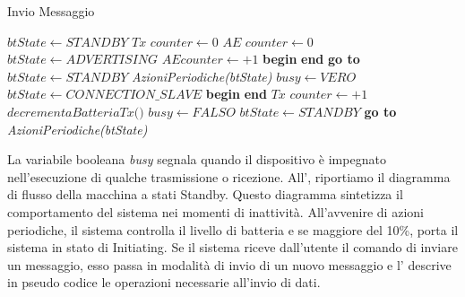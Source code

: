 \begin{algorithm}[ph]
	\caption{Invio Messaggio}\label{alg:invia_msg}
	\begin{algorithmic}[1]
		\State $ \textit{btState} \gets STANDBY$
		\EndIf
		\State $ \textit{Tx counter} \gets 0 $ 
		\Label {}
		\State $ \textit{AE counter} \gets 0 $ 
		\State $ \textit{btState} \gets ADVERTISING$
		\State $ AE counter \gets +1 $
		\State \textbf{begin}
		\State\hspace{\algorithmicindent}{ADVERTISING EVENT}
		\State \textbf{end}
		\State \textbf{go to} 
		\Else
		\State $btState \gets STANDBY$
		\State \textit{AzioniPeriodiche(btState)}
		\EndIf
		\EndIf
		\State $ \textit{busy}\gets VERO $
		\State $\textit{btState}\gets CONNECTION\_SLAVE$
		\State \textbf{begin}
		\State\hspace{\algorithmicindent}{CONNECTION EVENT}
		\State \textbf{end}
		\State $\textit{Tx counter}\gets +1$
		\State $ \textit{decrementaBatteriaTx()}$
		\State $\textit{busy}\gets FALSO$
		\State $ \textit{btState}\gets STANDBY $
		\State \textbf{go to} 
		\Else
		\State \textit{AzioniPeriodiche(btState)}
		\EndIf
		\EndFunction
	\end{algorithmic}
\end{algorithm}
La variabile booleana \textit{busy} segnala quando il dispositivo è impegnato nell'esecuzione di qualche trasmissione o ricezione. All', riportiamo il diagramma di flusso della macchina a stati Standby. Questo diagramma sintetizza il comportamento del sistema nei momenti di inattività. All'avvenire di azioni periodiche, il sistema controlla il livello di batteria e se maggiore del 10\%, porta il sistema in stato di Initiating. Se il sistema riceve dall'utente il comando di inviare un messaggio, esso passa in modalità di invio di un nuovo messaggio e l' descrive in pseudo codice le operazioni necessarie all'invio di dati.

